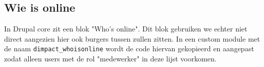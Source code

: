 \subsection{Wie is online}\label{wieisonline}

In Drupal core zit een blok "Who's online". Dit blok gebruiken we echter niet direct aangezien hier ook burgers tussen zullen zitten. In een custom module met de naam \texttt{dimpact\_whoisonline} wordt de code hiervan gekopieerd en aangepast zodat alleen users met de rol "medewerker" in deze lijst voorkomen.
